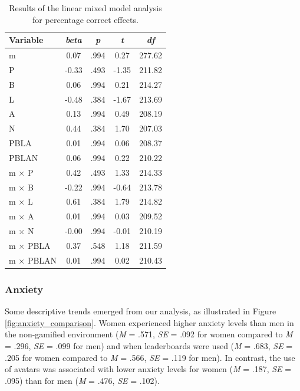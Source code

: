 \begin{table}[h]
    \centering
    \caption{Results of the linear mixed model analysis for percentage correct effects.}
    \label{tab:lmm_performance}
    \begin{tabular}{lcccc}
        \hline
        Variable & \textit{beta} & \textit{p} & \textit{t} & \textit{df} \\
        \hline
        m & 0.07 & .994 & 0.27 & 277.62 \\
        P & -0.33 & .493 & -1.35 & 211.82 \\
        B & 0.06 & .994 & 0.21 & 214.27 \\
        L & -0.48 & .384 & -1.67 & 213.69 \\
        A & 0.13 & .994 & 0.49 & 208.19 \\
        N & 0.44 & .384 & 1.70 & 207.03 \\
        PBLA & 0.01 & .994 & 0.06 & 208.37 \\
        PBLAN & 0.06 & .994 & 0.22 & 210.22 \\
        m $\times$ P & 0.42 & .493 & 1.33 & 214.33 \\
        m $\times$ B & -0.22 & .994 & -0.64 & 213.78 \\
        m $\times$ L & 0.61 & .384 & 1.79 & 214.82 \\
        m $\times$ A & 0.01 & .994 & 0.03 & 209.52 \\
        m $\times$ N & -0.00 & .994 & -0.01 & 210.19 \\
        m $\times$ PBLA & 0.37 & .548 & 1.18 & 211.59 \\
        m $\times$ PBLAN & 0.01 & .994 & 0.02 & 210.43 \\
        \hline
    \end{tabular}
\end{table}




\subsubsection{Anxiety}
Some descriptive trends emerged from our analysis, as illustrated in Figure \ref{fig:anxiety_comparison}.
Women experienced higher anxiety levels than men in the non-gamified environment (\textit{M} = .571, \textit{SE} = .092 for women compared to \textit{M} = .296, \textit{SE} = .099 for men) and when leaderboards were used (\textit{M} = .683, \textit{SE} = .205 for women compared to \textit{M} = .566, \textit{SE} = .119 for men).
In contrast, the use of avatars was associated with lower anxiety levels for women (\textit{M} = .187, \textit{SE} = .095) than for men (\textit{M} = .476, \textit{SE} = .102).

